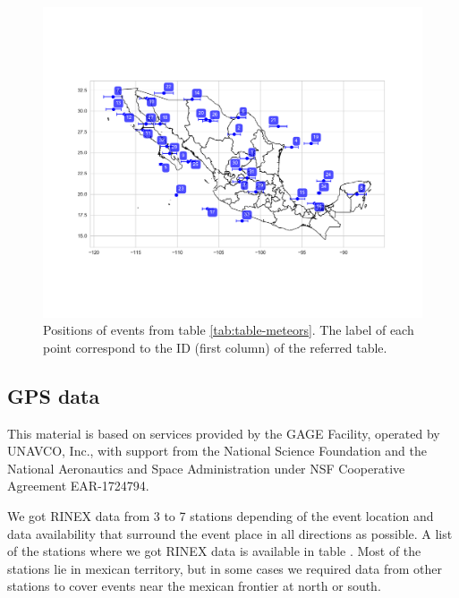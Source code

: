 \documentclass[times,twocolumn,final,authoryear]{elsarticle}
\begin{document}
\begin{figure}
  \centering
  \includegraphics[width=\linewidth]{../meteors_map}
  \caption{Positions of events from table \ref{tab:table-meteors}. The label of each point correspond to the ID (first column) of the referred table.}
  \label{fig:meteors-map}
\end{figure}

\subsection{GPS data}

This material is based on services provided by the GAGE Facility, operated by UNAVCO, Inc., with support from the National Science Foundation and the National Aeronautics and Space Administration under NSF Cooperative Agreement EAR-1724794.

We got RINEX data from 3 to 7 stations depending of the event location and data availability that surround the event place in all directions as possible. A list of the stations where we got RINEX data is available in table  . Most of the stations lie in mexican territory, but in some cases we required data from other stations to cover events near the mexican frontier at north or south.
\end{document}
